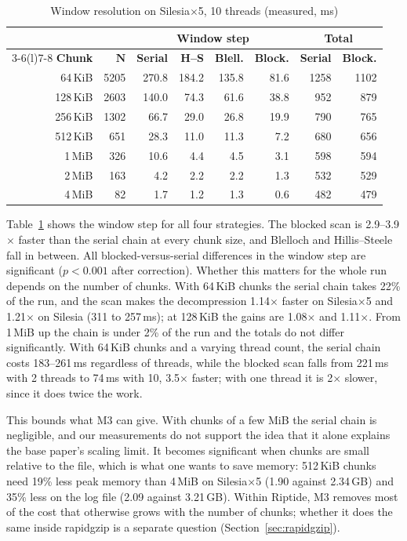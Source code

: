 \documentclass[conference]{IEEEtran}
\begin{document}
\begin{table}[t]
\caption{Window resolution on Silesia$\times$5, 10 threads (measured, ms)}
\label{tab:m3}
\centering
\footnotesize
\setlength{\tabcolsep}{2.6pt}
\begin{tabular}{@{}rrrrrrrr@{}}
\toprule
 & & \multicolumn{4}{c}{\textbf{Window step}} & \multicolumn{2}{c}{\textbf{Total}} \\
\cmidrule(lr){3-6}\cmidrule(l){7-8}
\textbf{Chunk} & $\boldsymbol{N}$ & \textbf{Serial} & \textbf{H--S} & \textbf{Blell.} & \textbf{Block.} & \textbf{Serial} & \textbf{Block.} \\
\midrule
64\,KiB & 5205 & 270.8 & 184.2 & 135.8 & 81.6 & 1258 & 1102 \\
128\,KiB & 2603 & 140.0 & 74.3 & 61.6 & 38.8 & 952 & 879 \\
256\,KiB & 1302 & 66.7 & 29.0 & 26.8 & 19.9 & 790 & 765 \\
512\,KiB & 651 & 28.3 & 11.0 & 11.3 & 7.2 & 680 & 656 \\
1\,MiB & 326 & 10.6 & 4.4 & 4.5 & 3.1 & 598 & 594 \\
2\,MiB & 163 & 4.2 & 2.2 & 2.2 & 1.3 & 532 & 529 \\
4\,MiB & 82 & 1.7 & 1.2 & 1.3 & 0.6 & 482 & 479 \\
\bottomrule
\end{tabular}
\end{table}

Table~\ref{tab:m3} shows the window step for all four strategies. The blocked scan
is 2.9--3.9$\times$ faster than the serial chain at every chunk size, and Blelloch
and Hillis--Steele fall in between. All
blocked-versus-serial differences in the window step are significant
($p < 0.001$ after correction). Whether this matters for the whole run depends on the
number of chunks. With 64\,KiB chunks the serial chain takes 22\% of the run, and the
scan makes the decompression 1.14$\times$ faster on Silesia$\times$5 and
1.21$\times$ on Silesia (311 to 257\,ms); at 128\,KiB the gains are 1.08$\times$ and
1.11$\times$. From 1\,MiB up the chain is under 2\% of the run and the totals do not
differ significantly. With 64\,KiB chunks and a varying thread count, the serial
chain costs 183--261\,ms regardless of threads, while the blocked scan falls from
221\,ms with 2 threads to 74\,ms with 10, 3.5$\times$ faster; with one thread it is
2$\times$ slower, since it does twice the work.

This bounds what M3 can give. With chunks of a few MiB the serial chain is
negligible, and our measurements do not support the idea that it
alone explains the base paper's scaling limit. It becomes significant when chunks are
small relative to the file, which is what one wants to save memory: 512\,KiB chunks
need 19\% less peak memory than 4\,MiB on Silesia$\times$5 (1.90 against 2.34\,GB)
and 35\% less on the log file (2.09 against 3.21\,GB). Within Riptide, M3 removes
most of the cost that otherwise grows with the number of chunks; whether it does the
same inside rapidgzip is a separate question (Section~\ref{sec:rapidgzip}).
\end{document}
